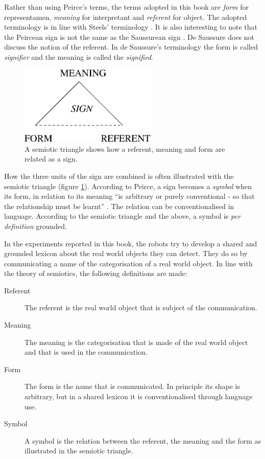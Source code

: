 

Rather than using Peirce's terms, the terms adopted in this book are {\em form} for representamen, {\em meaning} for interpretant and {\em referent} for object. The adopted terminology is in line with Steels' terminology \citep{steels:2000}. It is also interesting to note that the Peircean sign is not the same as the Saussurean sign \citep{saussure:1974}. De Saussure does not discuss the notion of the referent. In de Saussure's terminology the form is called {\em signifier} and the meaning is called the {\em signified}.


\begin{figure}
\centerline{\includegraphics[width=6.6cm]{introduction/semiotic3.eps}}
\caption{A semiotic triangle shows how a referent, meaning and form are related as a sign.}
\label{f:intro:semiotic}
\end{figure}

How the three units of the sign are combined is often illustrated with the semiotic triangle (figure \ref{f:intro:semiotic}). According to Peirce, a sign becomes a {\em symbol} when its form, in relation to its meaning ``is arbitrary or purely conventional - so that the relationship must be learnt'' \citep{chandler:1994}. The relation can be conventionalised in language. According to the semiotic triangle and the above, a symbol is {\em per definition} grounded.

In the experiments reported in this book, the robots try to develop a shared and grounded lexicon about the real world objects they can detect. They do so by communicating a name of the categorisation of a real world object. In line with the theory of semiotics, the following definitions are made:

\begin{description}

\item[Referent] The referent is the real world object that is subject of the communication.

\item[Meaning] The meaning is the categorisation that is made of the real world object and that is used in the communication.

\item[Form] The form is the name that is communicated. In principle its shape is arbitrary, but in a shared lexicon it is conventionalised through language use.

\item[Symbol] A symbol is the relation between the referent, the meaning and the form as illustrated in the semiotic triangle.

\end{description}



